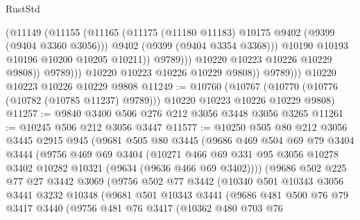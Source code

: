 \begin{lexlean}{RustStd}
\begin{coremodule}
                              (@11149
                                (@11155
                                  (@11165
                                    (@11175
                                      (@11180 @11183)
                                      @10175
                                      @9402
                                      (@9399 (@9404 @3360 @3056)))
                                    @9402
                                    (@9399 (@9404 @3354 @3368)))
                                  @10190
                                  @10193
                                  @10196
                                  @10200
                                  @10205
                                  @10211))
                              @9789)))
                        @10220
                        @10223
                        @10226
                        @10229
                        @9808))
                    @9789)))
              @10220
              @10223
              @10226
              @10229
              @9808))
          @9789)))
    @10220
    @10223
    @10226
    @10229
    @9808
@11249 := @10760
    (@10767 (@10770 (@10776 (@10782 (@10785 @11237) @9789))) @10220 @10223 @10226 @10229 @9808)
@11257 := @9840 @3400 @506 @276 @212 @3056 @3448 @3056 @3265
@11261 := @10245 @506 @212 @3056 @3447
@11577 := @10250
    @505
    @80
    @212
    @3056
    @3445
    @2915
    @945
    (@9681
      @505
      @80
      @3445
      (@9686
        @469
        @504
        @69
        @79
        @3404
        @3444
        (@9756
          @469
          @69
          @3404
          (@10271
            @466
            @69
            @331
            @95
            @3056
            @10278
            @3402
            @10282
            @10321
            (@9634 (@9636 @466 @69 @3402))))
        (@9686
          @502
          @225
          @77
          @27
          @3442
          @3069
          (@9756
            @502
            @77
            @3442
            (@10340
              @501
              @10343
              @3056
              @3441
              @3232
              @10348
              (@9681
                @501
                @10343
                @3441
                (@9686
                  @481
                  @500
                  @76
                  @79
                  @3417
                  @3440
                  (@9756
                    @481
                    @76
                    @3417
                    (@10362
                      @480
                      @703
                      @76

\end{coremodule}
\end{lexlean}
